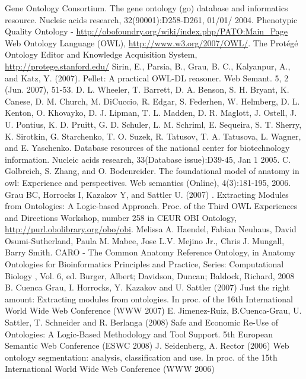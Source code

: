 \documentclass{ao2e}%
\begin{document}
\begin{thebibliography}{}

 Gene Ontology Consortium. The gene ontology (go) database and informatics resource. Nucleic acids research, 
32(90001):D258-D261, 01/01/ 2004. 
 Phenotypic Quality Ontology - \url{http://obofoundry.org/wiki/index.php/PATO:Main_Page}
 Web Ontology Language (OWL), \url{http://www.w3.org/2007/OWL/}.
 The Prot\'{e}g\'{e} Ontology Editor and Knowledge Acquisition System, \url{http://protege.stanford.edu/}
 Sirin, E., Parsia, B., Grau, B. C., Kalyanpur, A., and Katz, Y. (2007). Pellet: A practical OWL-DL reasoner. Web Semant. 5, 2 (Jun. 2007), 51-53. 
 D. L. Wheeler, T. Barrett, D. A. Benson, S. H. Bryant, K. Canese, D. M. Church, M. DiCuccio, R. Edgar, S. Federhen, 
W. Helmberg, D. L. Kenton, O. Khovayko, D. J. Lipman, T. L. Madden, D. R. Maglott, J. Ostell, J. U. Pontius, K. D. Pruitt, 
G. D. Schuler, L. M. Schriml, E. Sequeira, S. T. Sherry, K. Sirotkin, G. Starchenko, T. O. Suzek, R. Tatusov, T. A. Tatusova, 
L. Wagner, and E. Yaschenko. Database resources of the national center for biotechnology information. Nucleic acids 
research, 33(Database issue):D39-45, Jan 1 2005. 
 C. Golbreich, S. Zhang, and O. Bodenreider. The foundational model of anatomy in owl: Experience and perspectives. Web 
semantics (Online), 4(3):181-195, 2006. 
 Grau BC, Horrocks I, Kazakov Y, and Sattler U. (2007) . Extracting Modules from Ontologies: A Logic-based Approach. Proc. of the Third OWL Experiences and Directions Workshop, number 258 in CEUR 
 OBI Ontology, \url{http://purl.obolibrary.org/obo/obi}.
 Melissa A. Haendel, Fabian Neuhaus, David Osumi-Sutherland, Paula M. Mabee, Jose L.V. Mejino Jr., Chris J. Mungall, Barry Smith. CARO - The Common Anatomy Reference Ontology, in Anatomy Ontologies for Bioinformatics Principles and Practice, Series: Computational Biology , Vol. 6, ed. Burger, Albert; Davidson, Duncan; Baldock, Richard, 2008
 B. Cuenca Grau, I. Horrocks, Y. Kazakov and U. Sattler (2007) Just the right amount: Extracting modules from ontologies. In proc. of the 16th International World Wide Web Conference (WWW 2007) 
 E. Jimenez-Ruiz, B.Cuenca-Grau, U. Sattler, T. Schneider and R. Berlanga (2008) Safe and Economic Re-Use of Ontologies: A Logic-Based Methodology and Tool Support. 5th European Semantic Web Conference (ESWC 2008) 
 J. Seidenberg, A. Rector (2006) Web ontology segmentation: analysis, classification and use. In proc. of the 15th International World Wide Web Conference (WWW 2006) 

\end{thebibliography}
\end{document}
